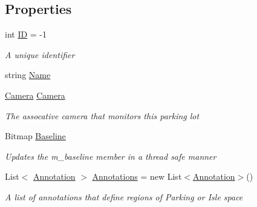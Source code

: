\subsection*{Properties}
\begin{DoxyCompactItemize}
\item 
int \mbox{\hyperlink{class_eagle_eye_1_1_models_1_1_parking_lot_a947f098cf468fb7856e4b72432318a72}{ID}} = -\/1
\begin{DoxyCompactList}\small\item\em A unique identifier \end{DoxyCompactList}\item 
string \mbox{\hyperlink{class_eagle_eye_1_1_models_1_1_parking_lot_ac2860bd9c6046f6f6b9b10461c0b4619}{Name}}
\item 
\mbox{\hyperlink{class_eagle_eye_1_1_models_1_1_camera}{Camera}} \mbox{\hyperlink{class_eagle_eye_1_1_models_1_1_parking_lot_acc11c12c8ab93ee8fa96894f20df38b3}{Camera}}
\begin{DoxyCompactList}\small\item\em The assocative camera that monitors this parking lot \end{DoxyCompactList}\item 
Bitmap \mbox{\hyperlink{class_eagle_eye_1_1_models_1_1_parking_lot_a1084b858315b2b9c303ec35dca58fe74}{Baseline}}
\begin{DoxyCompactList}\small\item\em Updates the m\+\_\+baseline member in a thread safe manner \end{DoxyCompactList}\item 
List$<$ \mbox{\hyperlink{class_eagle_eye_1_1_models_1_1_annotation}{Annotation}} $>$ \mbox{\hyperlink{class_eagle_eye_1_1_models_1_1_parking_lot_a8a80d92c49b0671de35a6649411a8593}{Annotations}} = new List$<$\mbox{\hyperlink{class_eagle_eye_1_1_models_1_1_annotation}{Annotation}}$>$()
\begin{DoxyCompactList}\small\item\em A list of annotations that define regions of Parking or Isle space \end{DoxyCompactList}\item 

\end{DoxyCompactItemize}
